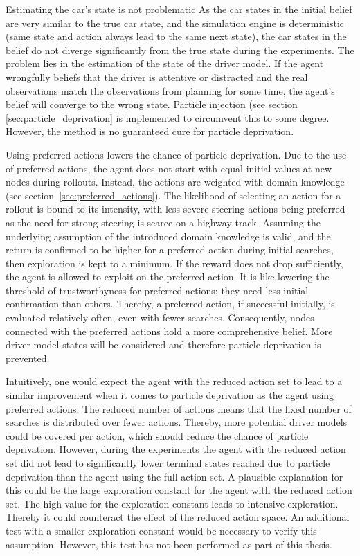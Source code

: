 Estimating the car's state is not problematic As the car states in the initial belief are very similar to the true car state, and the simulation engine is deterministic (same state and action always lead to the same next state), the car states in the belief do not diverge significantly from the true state during the experiments. The problem lies in the estimation of the state of the driver model. If the agent wrongfully beliefs that the driver is attentive or distracted and the real observations match the observations from planning for some time, the agent's belief will converge to the wrong state. Particle injection (see section \ref{sec:particle_deprivation} is implemented to circumvent this to some degree. However, the method is no guaranteed cure for particle deprivation.

Using preferred actions lowers the chance of particle deprivation. Due to the use of preferred actions, the agent does not start with equal initial values at new nodes during rollouts. Instead, the actions are weighted with domain knowledge (see section~\ref{sec:preferred_actions}). The likelihood of selecting an action for a rollout is bound to its intensity, with less severe steering actions being preferred as the need for strong steering is scarce on a highway track. Assuming the underlying assumption of the introduced domain knowledge is valid, and the return is confirmed to be higher for a preferred action during initial searches, then exploration is kept to a minimum. If the reward does not drop sufficiently, the agent is allowed to exploit on the preferred action. It is like lowering the threshold of trustworthyness for preferred actions; they need less initial confirmation than others. Thereby, a preferred  action, if successful initially, is evaluated relatively often, even with fewer searches. Consequently, nodes connected with the preferred actions hold a more comprehensive belief. More driver model states will be considered and therefore particle deprivation is prevented.

Intuitively, one would expect the agent with the reduced action set to lead to a similar improvement when it comes to particle deprivation as the agent using preferred actions. The reduced number of actions means that the fixed number of searches is distributed over fewer actions. Thereby, more potential driver models could be covered per action, which should reduce the chance of particle deprivation. However, during the experiments the agent with the reduced action set did not lead to significantly lower terminal states reached due to particle deprivation than the agent using the full action set. A plausible explanation for this could be the large exploration constant for the agent with the reduced action set. The high value for the exploration constant leads to intensive exploration. Thereby it could counteract the effect of the reduced action space. An additional test with a smaller exploration constant would be necessary to verify this assumption. However, this test has not been performed as part of this thesis.

